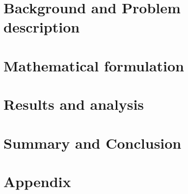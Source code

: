 \documentclass{article}
\begin{document}


%


\newpage

\section{Background and Problem description}



\newpage

\section{Mathematical formulation}



\newpage

\section{Results and analysis}



\newpage

\section{Summary and Conclusion}



\newpage

\section*{Appendix}



\newpage

%
%

%
\end{document}

